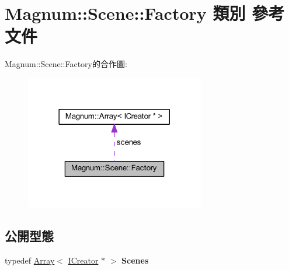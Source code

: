 \hypertarget{class_magnum_1_1_scene_1_1_factory}{}\section{Magnum\+:\+:Scene\+:\+:Factory 類別 參考文件}
\label{class_magnum_1_1_scene_1_1_factory}


Magnum\+:\+:Scene\+:\+:Factory的合作圖\+:\nopagebreak
\begin{figure}[H]
\begin{center}
\leavevmode
\includegraphics[width=222pt]{class_magnum_1_1_scene_1_1_factory__coll__graph}
\end{center}
\end{figure}
\subsection*{公開型態}
\begin{DoxyCompactItemize}
\item 
typedef \hyperlink{class_magnum_1_1_array}{Array}$<$ \hyperlink{class_magnum_1_1_scene_1_1_i_creator}{I\+Creator} $\ast$ $>$ {\bfseries Scenes}\hypertarget{class_magnum_1_1_scene_1_1_factory_a26add9fd5410be3bfcda7cf0d30d7efc}{}\label{class_magnum_1_1_scene_1_1_factory_a26add9fd5410be3bfcda7cf0d30d7efc}

\end{DoxyCompactItemize}
